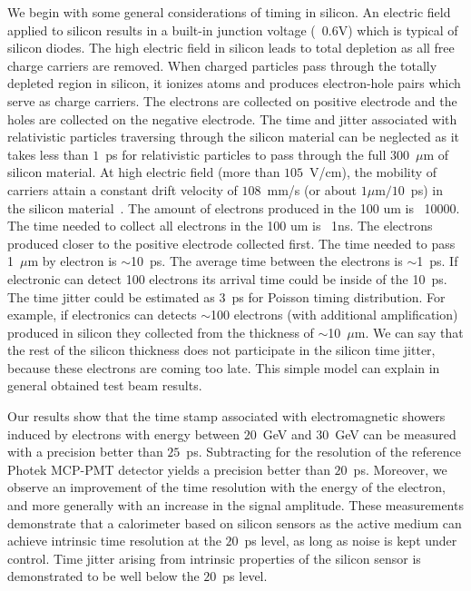 \documentclass[12pt]{article}
\begin{document}
{We begin with some general considerations of timing in silicon.
An electric field applied to silicon results in a built-in junction voltage
(~0.6V) which is typical of silicon diodes. The high electric field in silicon
leads to total depletion as all free charge carriers are removed. 
When charged particles pass through the totally depleted region in silicon, 
it ionizes atoms and produces electron-hole pairs which serve as charge carriers.
The electrons are collected on positive electrode and the holes are collected
on the negative electrode. The time and jitter associated with relativistic particles 
traversing through the silicon material can be neglected as it takes 
less than $1$~ps for relativistic particles to pass through the full $300$~$\mu$m
of silicon material. At high electric field (more than $105$~V/cm), the mobility 
of carriers attain a constant drift velocity of $108$~mm/s 
(or about $1\mu$m$/10$~ps) in the silicon material~\cite{Ronzhin2015}. 
The amount of electrons produced in the 100 um is ~10000. The
time needed to collect all electrons in the 100 um is ~1ns. The electrons produced closer to 
the positive electrode collected first. The time needed to pass 1~$\mu$m by electron 
is $\sim$10~ps. The average time between the
electrons is $\sim$1~ps. If electronic can detect 100 electrons its arrival time
could be inside of the 10~ps. The time jitter could be estimated as 3~ps for
Poisson timing distribution. For example, if electronics can detects $\sim$100
electrons (with additional amplification) produced in silicon they collected
from the thickness of $\sim$10~$\mu$m. We can say that the rest of the silicon
thickness does not participate in the silicon time jitter, because these
electrons are coming too late. This simple model can explain in general
obtained test beam results. 

Our results show that the time stamp associated with electromagnetic 
showers induced by electrons with energy between $20$~GeV and $30$~GeV 
can be measured with a precision better than $25$~ps. Subtracting for the resolution
of the reference Photek MCP-PMT detector yields a precision better than $20$~ps. 
Moreover, we observe an improvement of the time resolution with the energy of 
the electron, and more generally with an increase in the signal amplitude. 
These measurements demonstrate that a calorimeter based on silicon sensors as
the active medium can achieve intrinsic time resolution at the $20$~ps level, as long
as noise is kept under control. Time jitter arising from intrinsic properties of the
silicon sensor is demonstrated to be well below the $20$~ps level.

}
\end{document}
